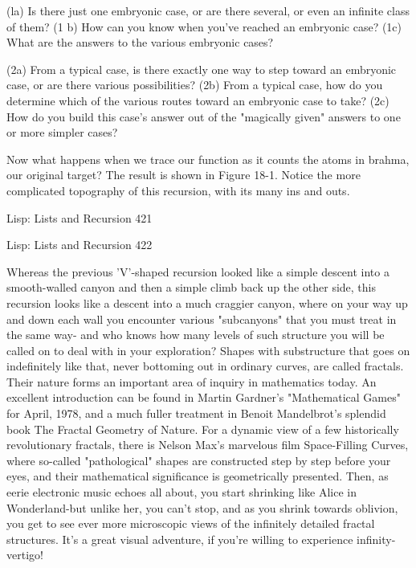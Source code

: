        (la) Is there just one embryonic case, or are there several, or even an
                infinite class of them?
       (1 b) How can you know when you've reached an embryonic case?
       (1c) What are the answers to the various embryonic cases?

       (2a) From a typical case, is there exactly one way to step toward an
              embryonic case, or are there various possibilities?
       (2b) From a typical case, how do you determine which of the various
              routes toward an embryonic case to take?
       (2c) How do you build this case's answer out of the "magically given"
              answers to one or more simpler cases?

      Now what happens when we trace our function as it counts the atoms in
brahma, our original target? The result is shown in Figure 18-1. Notice the more
complicated topography of this recursion, with its many ins and outs.




Lisp: Lists and Recursion                                                             421

Lisp: Lists and Recursion   422

         Whereas the previous 'V'-shaped recursion looked like a simple descent into a
 smooth-walled canyon and then a simple climb back up the other side, this recursion
  looks like a descent into a much craggier canyon, where on your way up and down
  each wall you encounter various "subcanyons" that you must treat in the same way-
 and who knows how many levels of such structure you will be called on to deal with
                                   in your exploration?
        Shapes with substructure that goes on indefinitely like that, never bottoming
out in ordinary curves, are called fractals. Their nature forms an important area of
inquiry in mathematics today. An excellent introduction can be found in Martin
Gardner's "Mathematical Games" for April, 1978, and a much fuller treatment in
Benoit Mandelbrot's splendid book The Fractal Geometry of Nature. For a dynamic
view of a few historically revolutionary fractals, there is Nelson Max's marvelous film
Space-Filling Curves, where so-called "pathological" shapes are constructed step by
step before your eyes, and their mathematical significance is geometrically presented.
Then, as eerie electronic music echoes all about, you start shrinking like Alice in
Wonderland-but unlike her, you can't stop, and as you shrink towards oblivion, you
get to see ever more microscopic views of the infinitely detailed fractal structures. It's
a great visual adventure, if you're willing to experience infinity-vertigo!

